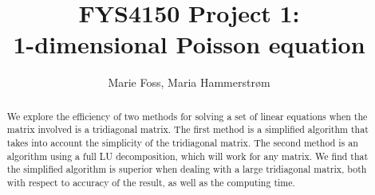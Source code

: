 \documentclass{article}
\title{\textbf{FYS4150 Project 1: \\1-dimensional Poisson equation}}
\author{Marie Foss, Maria Hammerstr{{\o}}m}
\date{} %
\begin{document}
\maketitle

\begin{abstract}
	\noindent We explore the efficiency of two methods for solving a set of linear equations when the matrix involved is a tridiagonal matrix. The first method is a simplified algorithm that takes into account the simplicity of the tridiagonal matrix. The second method is an algorithm using a full LU decomposition, which will work for any matrix. We find that the simplified algorithm is superior when dealing with a large tridiagonal matrix, both with respect to accuracy of the result, as well as the computing time. 
	\vspace*{2ex}
\end{abstract}
\end{document}
